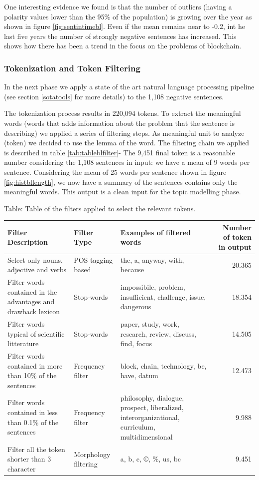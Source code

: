 \documentclass[]{book}
\begin{document}
One interesting evidence we found is that the number of outliers (having
a polarity values lower than the 95\% of the population) is growing over
the year as shown in figure \ref{fig:sentintimebl}. Even if the mean
remains near to -0.2, int he last five years the number of strongly
negative sentences has increased. This shows how there has been a trend
in the focus on the problems of blockchain.

\subsubsection*{Tokenization and Token
Filtering}\label{tokenization-and-token-filtering}

In the next phase we apply a state of the art natural language
processing pipeline (see section \ref{sotatools} for more details) to
the 1,108 negative sentences.

The tokenization process results in 220,094 tokens. To extract the
meaningful words (words that adds information about the problem that the
sentence is describing) we applied a series of filtering steps. As
meaningful unit to analyze (token) we decided to use the lemma of the
word. The filtering chain we applied is described in table
\ref{tab:tableblfilter}- The 9,451 final token is a reasonable number
considering the 1,108 sentences in input: we have a mean of 9 words per
sentence. Considering the mean of 25 words per sentence shown in figure
\ref{fig:histbllength}, we now have a summary of the sentences contains
only the meaningful words. This output is a clean input for the topic
modelling phase.

Table: \label{tab:tableblfilter} Table of the filters applied to select the
relevant tokens.

\begin{tabular}{l|l|l|r}
\hline
Filter Description & Filter Type & Examples of filtered words & Number of token in output\\
\hline
Select only nouns, adjective and verbs & POS tagging based & the, a, anyway, with, because & 20.365\\
\hline
Filter words contained in the advantages and drawback lexicon & Stop-words & impossibile, problem, insufficient, challenge, issue, dangerous & 18.354\\
\hline
Filter words typical of scientific litterature & Stop-words & paper, study, work, research, review, discuss, find, focus & 14.505\\
\hline
Filter words contained in more than 10\% of the sentences & Frequency filter & block, chain, technology, be, have, datum & 12.473\\
\hline
Filter words contained in less than 0.1\% of the sentences & Frequency filter & philosophy, dialogue, prospect, liberalized, interorganizational, curriculum, multidimensional & 9.988\\
\hline
Filter all the token shorter than 3 character & Morphology filtering & a, b, c, ©, \%, us, bc & 9.451\\
\hline
\end{tabular}
\end{document}
